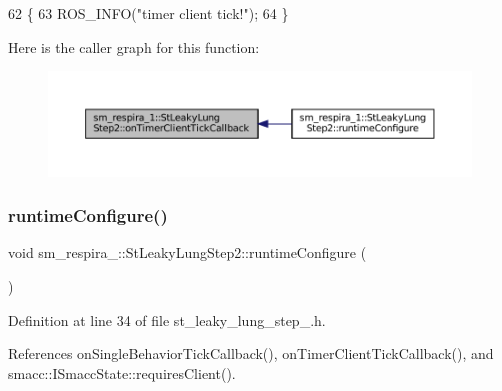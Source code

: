 \begin{DoxyCode}
62     \{
63         ROS\_INFO(\textcolor{stringliteral}{"timer client tick!"});
64     \}
\end{DoxyCode}
Here is the caller graph for this function\+:
\nopagebreak
\begin{figure}[H]
\begin{center}
\leavevmode
\includegraphics[width=350pt]{structsm__respira__1_1_1StLeakyLungStep2_ae8f613e81c6e1a1a2ad39fbb27dc7bea_icgraph}
\end{center}
\end{figure}
\mbox{\label{structsm__respira__1_1_1StLeakyLungStep2_a738290d02e5356fd5a49ae0bb5214e7e}} 
\subsubsection{\texorpdfstring{runtime\+Configure()}{runtimeConfigure()}}
{\footnotesize\ttfamily void sm\+\_\+respira\+\_\+::\+St\+Leaky\+Lung\+Step2\+::runtime\+Configure (\begin{DoxyParamCaption}{ }\end{DoxyParamCaption})\hspace{0.3cm}{\ttfamily [inline]}}



Definition at line 34 of file st\+\_\+leaky\+\_\+lung\+\_\+step\+\_.\+h.



References on\+Single\+Behavior\+Tick\+Callback(), on\+Timer\+Client\+Tick\+Callback(), and smacc\+::\+I\+Smacc\+State\+::requires\+Client().


